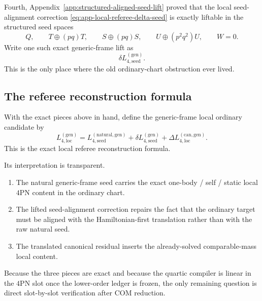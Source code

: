 \documentclass[11pt]{article}
\begin{document}
Fourth, Appendix~\ref{app:structured-aligned-seed-lift} proved that the local
seed-alignment correction \eqref{eq:app-local-referee-delta-seed} is exactly
liftable in the structured seed spaces
\begin{equation}
Q,
\qquad
T\oplus(pq)T,
\qquad
S\oplus(pq)S,
\qquad
U\oplus(p^2q^2)U,
\qquad
W=0.
\label{eq:app-local-referee-structured-spaces}
\end{equation}
Write one such exact generic-frame lift as
\begin{equation}
\delta L_{4,\mathrm{seed}}^{(\mathrm{gen})}.
\label{eq:app-local-referee-delta-seed-gen}
\end{equation}
This is the only place where the old ordinary-chart obstruction ever lived.

\subsection{The referee reconstruction formula}
\label{app:local-referee-reconstruction-formula}

With the exact pieces above in hand, define the generic-frame local ordinary
candidate by
\begin{equation}
L_{4,\mathrm{loc}}^{(\mathrm{gen})}
=
L_{4,\mathrm{seed}}^{(\mathrm{natural,gen})}
+
\delta L_{4,\mathrm{seed}}^{(\mathrm{gen})}
+
\Delta L_{4,\mathrm{loc}}^{(\mathrm{can,gen})}.
\label{eq:app-local-referee-master-assembly}
\end{equation}
This is the exact local referee reconstruction formula.

Its interpretation is transparent.

\begin{enumerate}
\item
The natural generic-frame seed carries the exact one-body / self / static local
$4$PN content in the ordinary chart.
\item
The lifted seed-alignment correction repairs the fact that the ordinary target
must be aligned with the Hamiltonian-first translation rather than with the raw
natural seed.
\item
The translated canonical residual inserts the already-solved comparable-mass
local content.
\end{enumerate}

Because the three pieces are exact and because the quartic compiler is linear in
the $4$PN slot once the lower-order ledger is frozen, the only remaining question
is direct slot-by-slot verification after COM reduction.
\end{document}
